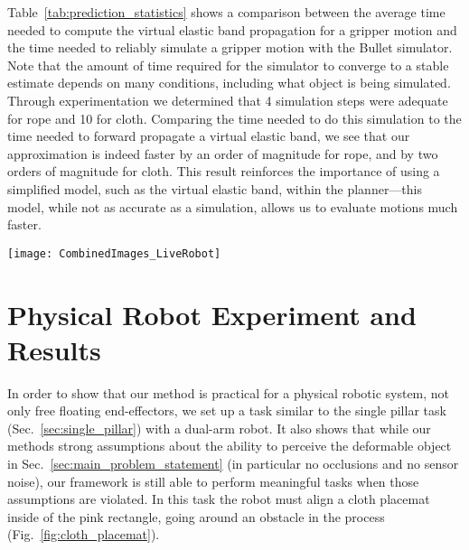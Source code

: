 
Table~\ref{tab:prediction_statistics} shows a comparison between the average time needed to compute the virtual elastic band propagation for a gripper motion and the time needed to reliably simulate a gripper motion with the Bullet simulator. Note that the amount of time required for the simulator to converge to a stable estimate depends on many conditions, including what object is being simulated. Through experimentation we determined that 4 simulation steps were adequate for rope and 10 for cloth. Comparing the time needed to do this simulation to the time needed to forward propagate a virtual elastic band, we see that our approximation is indeed faster by an order of magnitude for rope, and by two orders of magnitude for cloth. This result reinforces the importance of using a simplified model, such as the virtual elastic band, within the planner---this model, while not as accurate as a simulation, allows us to evaluate motions much faster.





\begin{figure*}[t]
    \centering
    \texttt{[image: CombinedImages\_LiveRobot]}
    \vspace{-1.7in}
    \caption{Cloth placemat task. The placemat starts on the far side of an obstacle and must be aligned with the pink rectangle near the robot.}
    \label{fig:cloth_placemat}
\end{figure*}



\section{Physical Robot Experiment and Results}
\label{sec:live_robot}

In order to show that our method is practical for a physical robotic system, not only free floating end-effectors, we set up a task similar to the single pillar task (Sec.~\ref{sec:single_pillar}) with a dual-arm robot. It also shows that while our methods strong assumptions about the ability to perceive the deformable object in Sec.~\ref{sec:main_problem_statement} (in particular no occlusions and no sensor noise), our framework is still able to perform meaningful tasks when those assumptions are violated. In this task the robot must align a cloth placemat inside of the pink rectangle, going around an obstacle in the process (Fig.~\ref{fig:cloth_placemat}).






